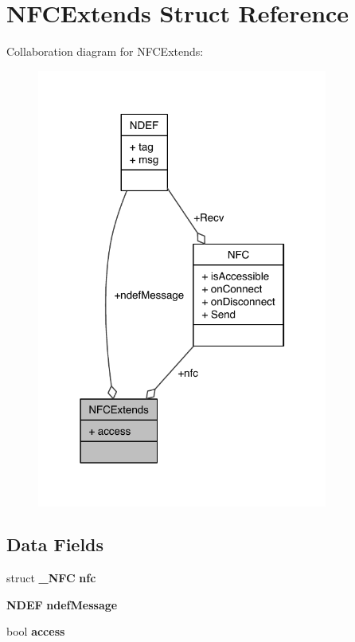 \section{N\-F\-C\-Extends Struct Reference}
\label{structNFCExtends}


Collaboration diagram for N\-F\-C\-Extends\-:
\nopagebreak
\begin{figure}[H]
\begin{center}
\leavevmode
\includegraphics[width=271pt]{structNFCExtends__coll__graph}
\end{center}
\end{figure}
\subsection*{Data Fields}
\begin{DoxyCompactItemize}
\item 
struct {\bf \-\_\-\-N\-F\-C} {\bfseries nfc}\label{structNFCExtends_aed664db6d799a193053b271db29c18e2}

\item 
{\bf N\-D\-E\-F} {\bfseries ndef\-Message}\label{structNFCExtends_a7694a42bbcafbb86fca7ce968ab30073}

\item 
bool {\bfseries access}\label{structNFCExtends_aaf16491c4fd96d422afa6a366cb16e63}

\end{DoxyCompactItemize}


